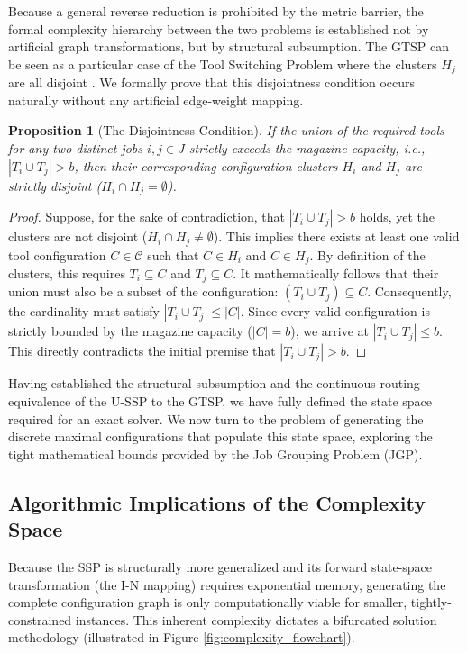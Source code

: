 \documentclass[12pt]{article}
\newtheorem{proposition}{Proposition}[section]
\begin{document}
Because a general reverse reduction is prohibited by the metric barrier, the formal complexity hierarchy between the two problems is established not by artificial graph transformations, but by structural subsumption. The GTSP can be seen as a particular case of the Tool Switching Problem where the clusters $H_j$ are all disjoint \citep{Colares2026}. We formally prove that this disjointness condition occurs naturally without any artificial edge-weight mapping.

\begin{proposition}[The Disjointness Condition]
	If the union of the required tools for any two distinct jobs $i, j \in J$ strictly exceeds the magazine capacity, i.e., $|T_i \cup T_j| > b$, then their corresponding configuration clusters $H_i$ and $H_j$ are strictly disjoint ($H_i \cap H_j = \emptyset$).
\end{proposition}
\begin{proof}
	Suppose, for the sake of contradiction, that $|T_i \cup T_j| > b$ holds, yet the clusters are not disjoint ($H_i \cap H_j \neq \emptyset$). This implies there exists at least one valid tool configuration $C \in \mathcal{C}$ such that $C \in H_i$ and $C \in H_j$. By definition of the clusters, this requires $T_i \subseteq C$ and $T_j \subseteq C$. It mathematically follows that their union must also be a subset of the configuration: $(T_i \cup T_j) \subseteq C$. Consequently, the cardinality must satisfy $|T_i \cup T_j| \le |C|$. Since every valid configuration is strictly bounded by the magazine capacity ($|C| = b$), we arrive at $|T_i \cup T_j| \le b$. This directly contradicts the initial premise that $|T_i \cup T_j| > b$.
\end{proof}

Having established the structural subsumption and the continuous routing equivalence of the U-SSP to the GTSP, we have fully defined the state space required for an exact solver. We now turn to the problem of generating the discrete maximal configurations that populate this state space, exploring the tight mathematical bounds provided by the Job Grouping Problem (JGP).

\subsection{Algorithmic Implications of the Complexity Space}

Because the SSP is structurally more generalized and its forward state-space transformation (the I-N mapping) requires exponential memory, generating the complete configuration graph is only computationally viable for smaller, tightly-constrained instances. This inherent complexity dictates a bifurcated solution methodology (illustrated in Figure \ref{fig:complexity_flowchart}).
\end{document}
